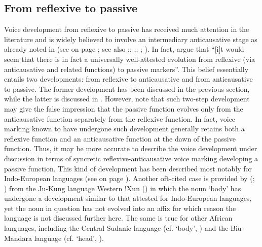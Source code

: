 \subsection{From reflexive to passive} \label{diachrony:refl2pass}
Voice development from reflexive to passive has received much attention in the literature and is widely believed to involve an intermediary anticausative stage as already noted in  (see  on page \pageref{fig:ch7:unidirectional}; see also \citealt[44f.]{haspelmath:1990};; \citealt[197f.]{kemmer:1993};; \citealt[253]{heine:kuteva:2002}; \citealt[225f.]{zuniga:kittila:2019}). In fact, \cite[205]{heine:miyashita:2008} argue that “[i]t would seem that there is in fact a universally well-attested evolution from reflexive (via anticausative and related functions) to passive markers”. This belief essentially entails two developments: from reflexive to anticausative and from anticausative to passive. The former development has been discussed in the previous section, while the latter is discussed in . However, note that such two-step development may give the false impression that the passive function evolves only from the anticausative function separately from the reflexive function. In fact, voice marking known to have undergone such development generally retains both a reflexive function and an anticausative function at the dawn of the passive function. Thus, it may be more accurate to describe the voice development under discussion in terms of syncretic reflexive-anticausative voice marking developing a passive function. This kind of development has been described most notably for Indo-European languages (see  on page \pageref{tab:ch7:syncretism-ie}). Another oft-cited case is provided by \citeauthor{heine:kuteva:2002} (\citeyear[44]{heine:kuteva:2002}; \citeyear[110ff.]{heine:kuteva:2007}) from the Ju-Kung language Western !Xun () in which the noun  ‘body’ has undergone a development similar to that attested for Indo-European languages, yet the noun in question has not evolved into an affix for which reason the language is not discussed further here. The same is true for other African languages, including the Central Sudanic language  (cf.  ‘body’, \citealt[203f.]{heine:miyashita:2008}) and the Biu-Mandara language  (cf.  ‘head’, \citealt[44]{haspelmath:1990}).

